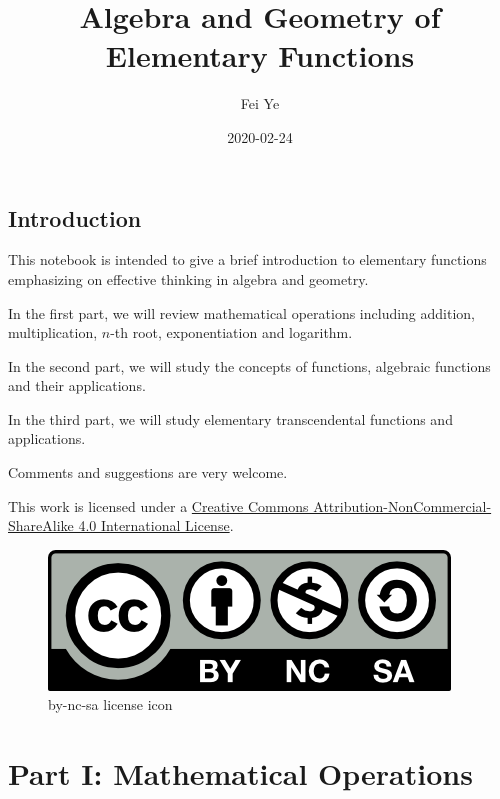 \documentclass[en,12pt]{elegantbook}
\title{Algebra and Geometry of Elementary Functions}
\author{Fei Ye}
\date{2020-02-24}
\renewcommand{\baselinestretch}{1.1}
\renewcommand{\baselinestretch}{0.975}
\begin{document}
\maketitle

{
\setcounter{tocdepth}{0}
\tableofcontents
}
\mainmatter

\hypersetup{pageanchor=true}

\renewcommand{\baselinestretch}{1.05}\normalsize

\captionsetup[figure]{labelformat=empty}
\captionsetup[subfigure]{labelformat=empty}

\hypertarget{introduction}{%
\chapter*{Introduction}\label{introduction}}

This notebook is intended to give a brief introduction to elementary functions emphasizing on effective thinking in algebra and geometry.

In the first part, we will review mathematical operations including addition, multiplication, \(n\)-th root, exponentiation and logarithm.

In the second part, we will study the concepts of functions, algebraic functions and their applications.

In the third part, we will study elementary transcendental functions and applications.

Comments and suggestions are very welcome.

This work is licensed under a \href{https://creativecommons.org/licenses/by-nc-sa/4.0/}{Creative Commons Attribution-NonCommercial-ShareAlike 4.0 International License}.

\begin{figure}
\centering
\includegraphics{figs/by-nc-sa.png}
\caption{by-nc-sa license icon}
\end{figure}

\hypertarget{part-part-i-mathematical-operations}{%
\part*{Part I: Mathematical Operations}\label{part-part-i-mathematical-operations}}
\end{document}
